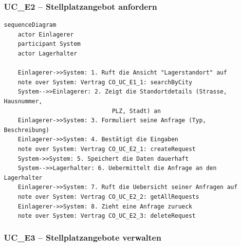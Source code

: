 \newpage

{}
\subsubsection*{UC\_E2 – Stellplatzangebot anfordern}

\begin{lstlisting}[basicstyle=\ttfamily\small, breaklines=true]
sequenceDiagram
    actor Einlagerer
    participant System
    actor Lagerhalter

    Einlagerer->>System: 1. Ruft die Ansicht "Lagerstandort" auf
    note over System: Vertrag CO_UC_E1_1: searchByCity
    System-->>Einlagerer: 2. Zeigt die Standortdetails (Strasse, Hausnummer,
                               PLZ, Stadt) an
    Einlagerer->>System: 3. Formuliert seine Anfrage (Typ, Beschreibung)
    Einlagerer->>System: 4. Bestätigt die Eingaben
    note over System: Vertrag CO_UC_E2_1: createRequest
    System->>System: 5. Speichert die Daten dauerhaft
    System-->>Lagerhalter: 6. Uebermittelt die Anfrage an den Lagerhalter
    Einlagerer->>System: 7. Ruft die Uebersicht seiner Anfragen auf
    note over System: Vertrag CO_UC_E2_2: getAllRequests
    Einlagerer->>System: 8. Zieht eine Anfrage zurueck
    note over System: Vertrag CO_UC_E2_3: deleteRequest
\end{lstlisting}

\newpage

{}
\subsubsection*{UC\_E3 – Stellplatzangebote verwalten}

